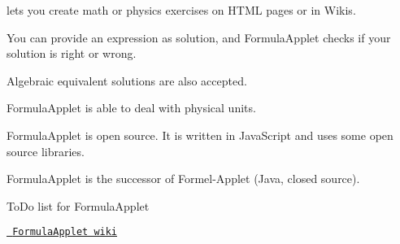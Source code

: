 
\begin{DoxyItemize}
\item lets you create math or physics exercises on H\+T\+ML pages or in Wikis.
\item You can provide an expression as solution, and Formula\+Applet checks if your solution is right or wrong.
\item Algebraic equivalent solutions are also accepted.
\item Formula\+Applet is able to deal with physical units.
\item Formula\+Applet is open source. It is written in Java\+Script and uses some open source libraries.
\item Formula\+Applet is the successor of Formel-\/\+Applet (Java, closed source).
\item To\+Do list for Formula\+Applet
\item \href{https://github.com/gro58/FormulaApplet/wiki}{\texttt{ Formula\+Applet wiki}} 
\end{DoxyItemize}